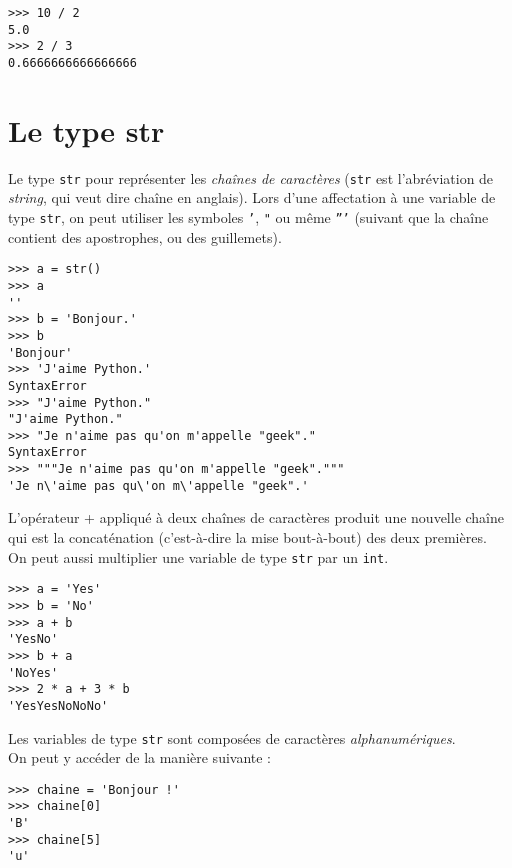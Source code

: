 \begin{pys}\begin{verbatim}
>>> 10 / 2
5.0
>>> 2 / 3
0.6666666666666666
\end{verbatim}
\end{pys}


\section{Le type str}

Le type \texttt{str} pour représenter les \textit{chaînes de caractères} (\texttt{str} est l'abréviation de \emph{string}, qui veut dire chaîne en anglais).
Lors d'une affectation à une variable de type \texttt{str}, on peut utiliser les symboles \texttt{'}, \texttt{"} ou même \texttt{'''} (suivant que la chaîne contient
des apostrophes, ou des guillemets).

\begin{pys}\begin{verbatim}
>>> a = str()
>>> a
''
>>> b = 'Bonjour.'
>>> b
'Bonjour'
>>> 'J'aime Python.'
SyntaxError
>>> "J'aime Python."
"J'aime Python."
>>> "Je n'aime pas qu'on m'appelle "geek"."
SyntaxError
>>> """Je n'aime pas qu'on m'appelle "geek"."""
'Je n\'aime pas qu\'on m\'appelle "geek".'
\end{verbatim}
\end{pys}

L'opérateur + appliqué à deux chaînes de caractères produit une nouvelle chaîne qui est la concaténation (c'est-à-dire la mise bout-à-bout) des deux premières.\\

On peut aussi multiplier une variable de type \texttt{str} par un \texttt{int}.\\

\begin{pys}\begin{verbatim}
>>> a = 'Yes'
>>> b = 'No'
>>> a + b
'YesNo'
>>> b + a
'NoYes'
>>> 2 * a + 3 * b
'YesYesNoNoNo'
\end{verbatim}
\end{pys}

Les variables de type \texttt{str} sont composées de caractères \emph{alphanumériques}.\\ On peut y accéder de la manière suivante :

\begin{pys}\begin{verbatim}
>>> chaine = 'Bonjour !'
>>> chaine[0]
'B'
>>> chaine[5]
'u'
\end{verbatim}
\end{pys}

